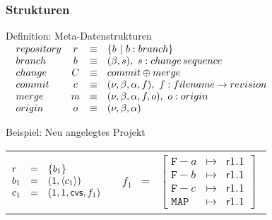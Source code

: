 \documentclass[german]{beamer}
\begin{document}
\begin{frame}
  \frametitle{Strukturen}

  \begin{block}{Definition: Meta-Datenstrukturen}
    \medskip
    $\begin{array}{@{\hspace{1em}}lccl}
      \STRUCT{repository} & r & \equiv & \{b\ |\ b : \STRUCT{branch}\} \\
      \STRUCT{branch}     & b & \equiv &
      (\beta, s),\ s : \STRUCT{change\,sequence} \\
      \STRUCT{change}     & C & \equiv &
      \STRUCT{commit}\oplus\STRUCT{merge} \\
      \STRUCT{commit}     & c & \equiv &
      (\nu, \beta, \alpha, f),\ f : \STRUCT{filename}\rightarrow
      \STRUCT{revision} \\
      \STRUCT{merge}      & m & \equiv &
      (\nu, \beta, \alpha, f, o),\ o : \STRUCT{origin} \\
      \STRUCT{origin}     & o & \equiv &
      (\nu, \beta, \alpha)      \end{array}$
  \end{block}

  \begin{block}{Beispiel: Neu angelegtes Projekt}
    \medskip
    \begin{tabular}{@{\hspace{1em}}ll}
      $\begin{array}{@{}lcl}
        r   &=& \{b_1\} \\
        b_1 &=& (1, \langle c_1 \rangle) \\
        c_1 &=& (1, 1, \mathsf{cvs}, f_1)
      \end{array}$ &
      $\begin{array}{lcl}
        f_1 &=& \left[
          \begin{array}{lcl}
            \mathtt{F-}a & \mapsto & \mathsf{r1.1} \\
            \mathtt{F-}b & \mapsto & \mathsf{r1.1} \\
            \mathtt{F-}c & \mapsto & \mathsf{r1.1} \\
            \mathtt{MAP} & \mapsto & \mathsf{r1.1}
          \end{array}
        \right]
      \end{array}$
    \end{tabular}
  \end{block}
\end{frame}
\end{document}
